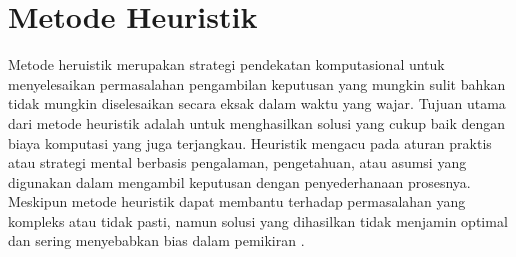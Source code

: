 \section{Metode Heuristik}
\vspace{-4mm}
{\frenchspacing
    Metode heruistik merupakan strategi pendekatan komputasional untuk menyelesaikan
    permasalahan pengambilan keputusan yang mungkin sulit bahkan tidak mungkin diselesaikan secara eksak dalam waktu yang wajar.
    Tujuan utama dari metode heuristik adalah untuk menghasilkan solusi yang cukup baik dengan biaya komputasi yang juga terjangkau.
    Heuristik mengacu pada aturan praktis atau strategi mental berbasis pengalaman, pengetahuan, atau asumsi yang digunakan dalam mengambil keputusan dengan penyederhanaan prosesnya.
    Meskipun metode heuristik dapat membantu terhadap permasalahan yang kompleks atau tidak pasti, namun solusi yang dihasilkan tidak menjamin optimal dan sering menyebabkan bias dalam pemikiran .

}
